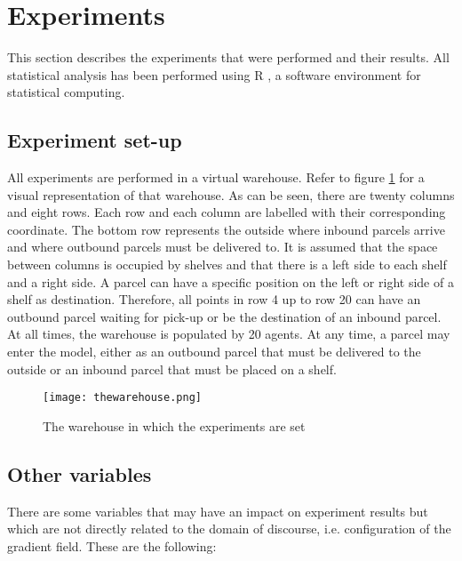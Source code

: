 \section{Experiments}\label{sec:experiments}
This section describes the experiments that were performed and their results. All statistical analysis has been performed using R \cite{rstats}, a software environment for statistical computing.

\subsection{Experiment set-up}\label{sec:setup}
All experiments are performed in a virtual warehouse. Refer to figure \ref{fig:thewarehouse} for a visual representation of that warehouse. As can be seen, there are twenty columns and eight rows. Each row and each column are labelled with their corresponding coordinate. The bottom row represents the outside where inbound parcels arrive and where outbound parcels must be delivered to. It is assumed that the space between columns is occupied by shelves and that there is a left side to each shelf and a right side. A parcel can have a specific position on the left or right side of a shelf as destination. Therefore, all points in row 4 up to row 20 can have an outbound parcel waiting for pick-up or be the destination of an inbound parcel. At all times, the warehouse is populated by 20 agents. At any time, a parcel may enter the model, either as an outbound parcel that must be delivered to the outside or an inbound parcel that must be placed on a shelf.

\begin{figure}[H]
    \centering
    \texttt{[image: thewarehouse.png]}
    \caption{The warehouse in which the experiments are set}
    \label{fig:thewarehouse}
\end{figure}

\subsection{Other variables}\label{sec:othervars}
There are some variables that may have an impact on experiment results but which are not directly related to the domain of discourse, i.e. configuration of the gradient field. These are the following:

